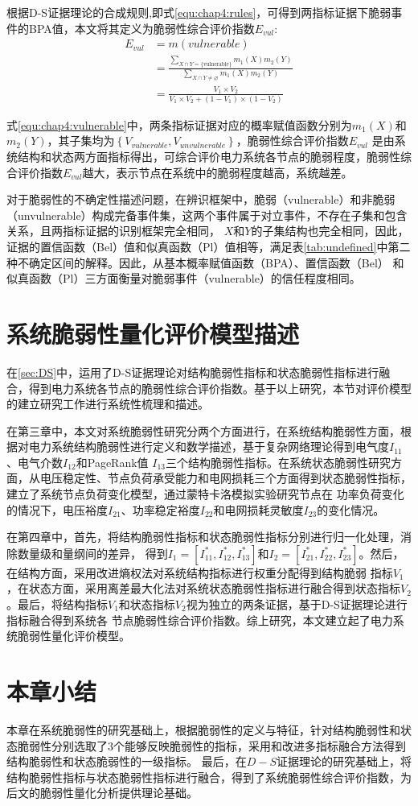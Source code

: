 根据D-S证据理论的合成规则,即式\ref{equ:chap4:rules}，可得到两指标证据下脆弱事件的BPA值，本文将其定义为脆弱性综合评价指数$E_{vul}$:
\begin{equation}
\label{equ:chap4:vulnerable}
\begin{aligned} E_{vul} &=m(vulnerable) \\ 
 &=\frac{\sum_{X \cap Y=\{\text {vulnerable}\}} m_{1}(X) m_{2}(Y)}{\sum_{X \cap Y \neq \varnothing} m_{1}(X) m_{2}(Y)} \\
 &=\frac{V_{1} \times V_{2}}{V_{1} \times V_{2}+\left(1-V_{1}\right) \times\left(1-V_{2}\right)} \end{aligned}
\end{equation}

式\ref{equ:chap4:vulnerable}中，两条指标证据对应的概率赋值函数分别为$m_1(X)$和$m_2(Y)$，其子集均为$\left\{V_{vulnerable},V_{unvulnerable} \right\}$，脆弱性综合评价指数$E_{vul}$
是由系统结构和状态两方面指标得出，可综合评价电力系统各节点的脆弱程度，脆弱性综合评价指数$E_{vul}$越大，表示节点在系统中的脆弱程度越高，系统越差。

对于脆弱性的不确定性描述问题，在辨识框架中，脆弱（vulnerable）和非脆弱（unvulnerable）构成完备事件集，这两个事件属于对立事件，不存在子集和包含关系，且两指标证据的识别框架完全相同，
$X$和$Y$的子集结构也完全相同，因此，证据的置信函数（Bel）值和似真函数（Pl）值相等，满足表\ref{tab:undefined}中第二种不确定区间的解释。因此，从基本概率赋值函数（BPA）、置信函数（Bel）
和似真函数（Pl）三方面衡量对脆弱事件（vulnerable）的信任程度相同。

\section{系统脆弱性量化评价模型描述}
\label{sec:systemQuan}
在\ref{sec:DS}中，运用了D-S证据理论对结构脆弱性指标和状态脆弱性指标进行融合，得到电力系统各节点的脆弱性综合评价指数。基于以上研究，本节对评价模型的建立研究工作进行系统性梳理和描述。

在第三章中，本文对系统脆弱性研究分两个方面进行，在系统结构脆弱性方面，根据对电力系统结构脆弱性进行定义和数学描述，基于复杂网络理论得到电气度$I_{11}$、电气介数$I_{12}$和PageRank值
$I_{13}$三个结构脆弱性指标。在系统状态脆弱性研究方面，从电压稳定性、节点负荷承受能力和电网损耗三个方面得到状态脆弱性指标，建立了系统节点负荷变化模型，通过蒙特卡洛模拟实验研究节点在
功率负荷变化的情况下，电压裕度$I_{21}$、功率稳定裕度$I_{22}$和电网损耗灵敏度$I_{23}$的变化情况。

在第四章中，首先，将结构脆弱性指标和状态脆弱性指标分别进行归一化处理，消除数量级和量纲间的差异，
得到$I_1 = \left[I^*_{11},I^*_{12},I^*_{13}\right]$和$I_2 = \left[I^*_{21},I^*_{22},I^*_{23}\right]$。然后，在结构方面，采用改进熵权法对系统结构指标进行权重分配得到结构脆弱
指标$V_1$，在状态方面，采用离差最大化法对系统状态脆弱性指标进行融合得到状态指标$V_2$。最后，将结构指标$V_1$和状态指标$V_2$视为独立的两条证据，基于D-S证据理论进行指标融合得到系统各
节点脆弱性综合评价指数。综上研究，本文建立起了电力系统脆弱性量化评价模型。
\section{本章小结}
\label{sec:sum4}
本章在系统脆弱性的研究基础上，根据脆弱性的定义与特征，针对结构脆弱性和状态脆弱性分别选取了3个能够反映脆弱性的指标，采用和改进多指标融合方法得到结构脆弱性和状态脆弱性的一级指标。
最后，在$D-S$证据理论的研究基础上，将结构脆弱性指标与状态脆弱性指标进行融合，得到了系统脆弱性综合评价指数，为后文的脆弱性量化分析提供理论基础。



